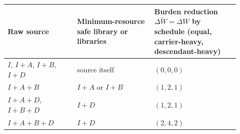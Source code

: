 \begin{tabular}{@{}>{\raggedright\arraybackslash}p{0.27\linewidth}>{\raggedright\arraybackslash}p{0.30\linewidth}>{\raggedright\arraybackslash}p{0.33\linewidth}@{}}
\toprule
Raw source & Minimum-resource safe library or libraries & Burden reduction \(\Delta\widetilde W=\Delta W\) by schedule (equal, carrier-heavy, descendant-heavy) \\
\midrule
\(I\), \(I{+}A\), \(I{+}B\), \(I{+}D\) & source itself & \((0,0,0)\) \\
\(I{+}A{+}B\) & \(I{+}A\) or \(I{+}B\) & \((1,2,1)\) \\
\(I{+}A{+}D\), \(I{+}B{+}D\) & \(I{+}D\) & \((1,2,1)\) \\
\(I{+}A{+}B{+}D\) & \(I{+}D\) & \((2,4,2)\) \\
\bottomrule
\end{tabular}

